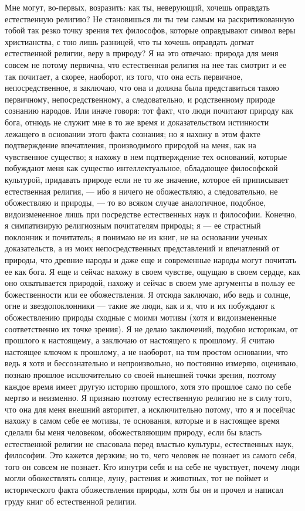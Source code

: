 \documentclass[12pt]{article}
\begin{document}
Мне могут, во-первых, возразить: как ты, неверующий, хочешь оправдать естественную религию? Не становишься ли ты тем самым на раскритикованную тобой так резко точку зрения тех философов, которые оправдывают символ веры христианства, с тою лишь разницей, что ты хочешь оправдать догмат естественной религии, веру в природу? Я на это отвечаю: природа для меня совсем не потому первична, что естественная религия на нее так смотрит и ее так почитает, а скорее, наоборот, из того, что она есть первичное, непосредственное, я заключаю, что она и должна была представиться такою первичному, непосредственному, а следовательно, и родственному природе сознанию народов. Или иначе говоря: тот факт, что люди почитают природу как бога, отнюдь не служит мне в то же время и доказательством истинности лежащего в основании этого факта сознания; но я нахожу в этом факте подтверждение впечатления, производимого природой на меня, как на чувственное существо; я нахожу в нем подтверждение тех оснований, которые побуждают меня как существо интеллектуальное, обладающее философской культурой, придавать природе если не то же значение, которое ей приписывает естественная религия, --- ибо я ничего не обожествляю, а следовательно, не обожествляю и природы, --- то во всяком случае аналогичное, подобное, видоизмененное лишь при посредстве естественных наук и философии. Конечно, я симпатизирую религиозным почитателям природы; я --- ее страстный поклонник и почитатель; я понимаю не из книг, не на основании ученых доказательств, а из моих непосредственных представлений и впечатлений от природы, что древние народы и даже еще и современные народы могут почитать ее как бога. Я еще и сейчас нахожу в своем чувстве, ощущаю в своем сердце, как оно охватывается природой, нахожу и сейчас в своем уме аргументы в пользу ее божественности или ее обожествления. Я отсюда заключаю, ибо ведь и солнце, огне и звездопоклонники --- такие же люди, как и я, что и их побуждают к обожествлению природы сходные с моими мотивы (хотя и видоизмененные соответственно их точке зрения). Я не делаю заключений, подобно историкам, от прошлого к настоящему, а заключаю от настоящего к прошлому. Я считаю настоящее ключом к прошлому, а не наоборот, на том простом основании, что ведь я хотя и бессознательно и непроизвольно, но постоянно измеряю, оцениваю, познаю прошлое исключительно со своей нынешней точки зрения, поэтому каждое время имеет другую историю прошлого, хотя это прошлое само по себе мертво и неизменно. Я признаю поэтому естественную религию не в силу того, что она для меня внешний авторитет, а исключительно потому, что я и посейчас нахожу в самом себе ее мотивы, те основания, которые и в настоящее время сделали бы меня человеком, обожествляющим природу, если бы власть естественной религии не спасовала перед властью культуры, естественных наук, философии. Это кажется дерзким; но то, чего человек не познает из самого себя, того он совсем не познает. Кто изнутри себя и на себе не чувствует, почему люди могли обожествлять солнце, луну, растения и животных, тот не поймет и исторического факта обожествления природы, хотя бы он и прочел и написал груду книг об естественной религии. 
\end{document}
